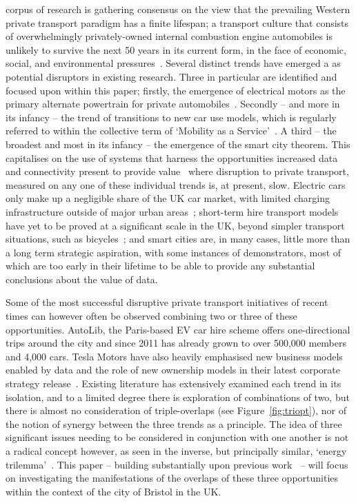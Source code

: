 \documentclass[journal]{IEEEtran}
\begin{document}
 corpus of research is gathering consensus on
the view that the prevailing Western private transport paradigm has a
finite lifespan; a transport culture that consists of overwhelmingly
privately-owned internal combustion engine automobiles is unlikely to
survive the next 50 years in its current form, in the face of
economic, social, and environmental
pressures~\cite{lerner:2011,van-audenhove-et-al:2014,black-et-al:2016}.
Several distinct trends have emerged a as potential disruptors in
existing research. Three in particular are identified and focused upon
within this paper; firstly, the emergence of electrical motors as the
primary alternate powertrain for private
automobiles~\cite{paffumi-et-al:2015,gnann-et-al:2015}.  Secondly --
and more in its infancy -- the trend of transitions to new car use
models, which is regularly referred to within the collective term of
`Mobility as a Service'~\cite{tscatapult:2016}. A third -- the
broadest and most in its infancy -- the emergence of the smart city
theorem. This capitalises on the use of systems that harness the
opportunities increased data and connectivity present to provide
value~\cite{townsend:2013,cosgrave-et-al:2013,ibm:2014} where
disruption to private transport, measured on any one of these
individual trends is, at present, slow. Electric cars only make up a
negligible share of the UK car market, with limited charging
infrastructure outside of major urban areas~\cite{dft:2008};
short-term hire transport models have yet to be proved at a
significant scale in the UK, beyond simpler transport situations, such
as bicycles~\cite{kamargianni-et-al:2016}; and smart cities are, in
many cases, little more than a long term strategic aspiration, with
some instances of demonstrators, most of which are too early in their
lifetime to be able to provide any substantial conclusions about the
value of data.

Some of the most successful disruptive private transport initiatives
of recent times can however often be observed combining two or three
of these opportunities. AutoLib, the Paris-based EV car hire scheme
offers one-directional trips around the city and since 2011 has
already grown to over 500,000 members and 4,000 cars. Tesla Motors
have also heavily emphasised new business models enabled by data and
the role of new ownership models in their latest corporate strategy
release~\cite{musk:2016}. Existing literature has extensively examined
each trend in its isolation, and to a limited degree there is
exploration of combinations of two, but there is almost no
consideration of triple-overlaps (see Figure~\ref{fig:triopt}), nor of
the notion of synergy between the three trends as a principle. The
idea of three significant issues needing to be considered in
conjunction with one another is not a radical concept however, as seen
in the inverse, but principally similar, `energy
trilemma'~\cite{wec:2015}. This paper -- building substantially upon
previous work~\cite{cooper-et-al-sose:2015} -- will focus on
investigating the manifestations of the overlaps of these three
opportunities within the context of the city of Bristol in the UK.
\end{document}
